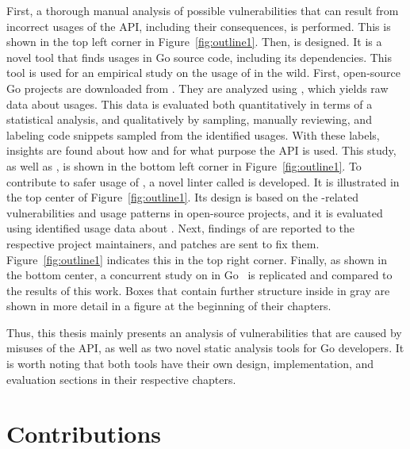 

First, a thorough manual analysis of possible vulnerabilities that can result from incorrect usages of the \unsafe{}
\acrshort{API}, including their consequences, is performed.
This is shown in the top left corner in Figure~\ref{fig:outline1}.
Then, \toolGeiger{} is designed.
It is a novel tool that finds \unsafe{} usages in Go source code, including its dependencies.
This tool is used for an empirical study on the usage of \unsafe{} in the wild.
First, open-source Go projects are downloaded from \github{}.
They are analyzed using \toolGeiger{}, which yields raw data about \unsafe{} usages.
This data is evaluated both quantitatively in terms of a statistical analysis, and qualitatively by sampling,
manually reviewing, and labeling code snippets sampled from the identified \unsafe{} usages.
With these labels, insights are found about how and for what purpose the \unsafe{} \acrshort{API} is used.
This study, as well as \toolGeiger{}, is shown in the bottom left corner in Figure~\ref{fig:outline1}.
To contribute to safer usage of \unsafe{}, a novel linter called \toolSafer{} is developed.
It is illustrated in the top center of Figure~\ref{fig:outline1}.
Its design is based on the \unsafe{}-related vulnerabilities and \unsafe{} usage patterns in open-source projects,
and it is evaluated using identified usage data about \unsafe{}.
Next, findings of \toolSafer{} are reported to the respective project maintainers, and patches are sent to fix them.
Figure~\ref{fig:outline1} indicates this in the top right corner.
Finally, as shown in the bottom center, a concurrent study on \unsafe{} in Go~\cite{costa2020} is replicated and
compared to the results of this work.
Boxes that contain further structure inside in gray are shown in more detail in a figure at the beginning of their
chapters.

Thus, this thesis mainly presents an analysis of vulnerabilities that are caused by misuses of the \unsafe{}
\acrshort{API}, as well as two novel static analysis tools for Go developers.
It is worth noting that both tools have their own design, implementation, and evaluation sections in their respective
chapters.



\section{Contributions}\label{sec:introduction:contributions}

